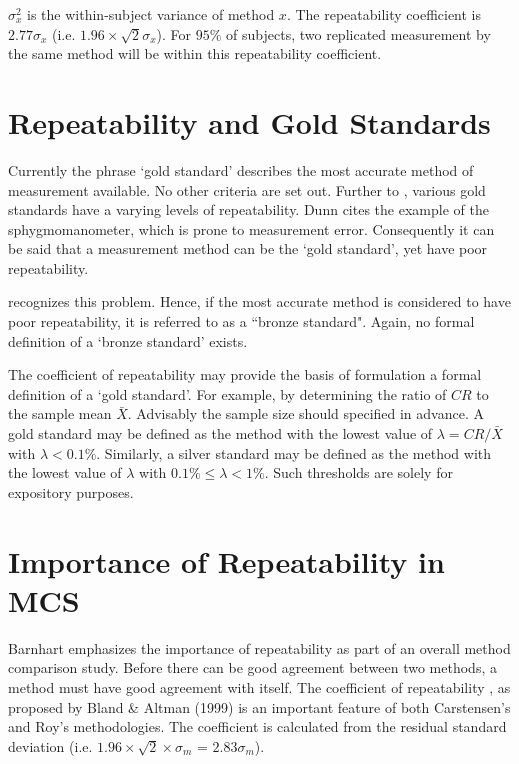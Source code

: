 \documentclass[12pt, a4paper]{report}
\theoremstyle{plain}
\theoremstyle{definition}
\theoremstyle{remark}
\begin{document}
	$\sigma^2_{x}$ is the within-subject variance of method $x$. The repeatability coefficient is $2.77 \sigma_{x}$ (i.e. $1.96 \times \sqrt{2} \sigma_{x}$). For $95\%$ of subjects, two replicated measurement by the same method will be within this repeatability coefficient.
	





		\section{Repeatability and Gold Standards}
		Currently the phrase `gold standard' describes the most accurate method of measurement available. No other criteria are set out. Further to \citet{dunnSEME}, various gold standards have a varying levels of repeatability. Dunn cites the example of the sphygmomanometer, which is prone to measurement error. Consequently it can be said that a measurement method can be the `gold standard', yet have poor repeatability. 
		
		\citet{dunnSEME} recognizes  this problem. Hence, if the most accurate method is considered to have poor repeatability, it is referred to as a ``bronze standard".  Again, no formal definition of a `bronze standard' exists.
		
		The coefficient of repeatability may provide the basis of formulation a formal definition of a `gold standard'. For example, by determining the ratio of $CR$ to the sample mean $\bar{X}$. Advisably the sample size should specified in advance. A gold standard may be defined as the method with the lowest value of $\lambda = CR /\bar{X}$ with $\lambda < 0.1\%$. Similarly, a silver standard may be defined as the method with the lowest value of $\lambda $ with $0.1\% \leq \lambda < 1\%$. Such thresholds are solely for expository purposes.
		

	\section{Importance of Repeatability in MCS}
	
	
	
	Barnhart emphasizes the importance of repeatability as part of an overall method comparison study. Before there can be good agreement between two methods, a method must have good agreement with itself. The coefficient of repeatability , as proposed by Bland \& Altman (1999) is an important feature of both Carstensen's and Roy's methodologies. The coefficient is calculated from the residual standard deviation (i.e. $1.96 \times \sqrt{2} \times \sigma_m$ = $2.83 \sigma_m$).
	
\end{document}
